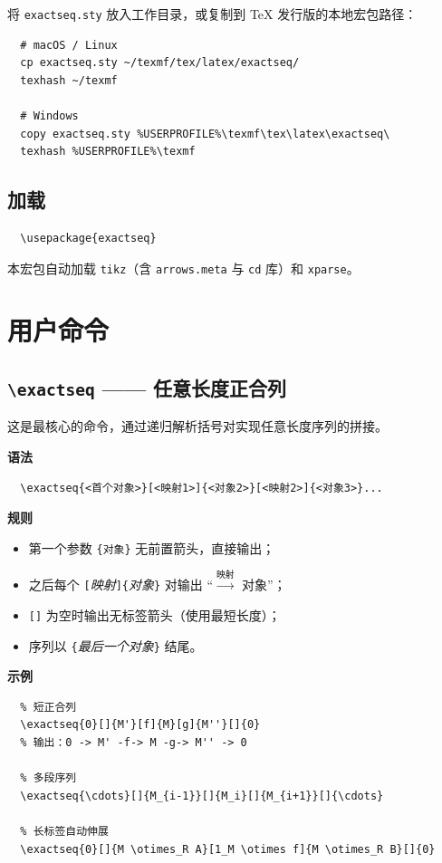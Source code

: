 \documentclass[fontset=fandol]{ctexart}
\newcommand{\pkg}[1]{\texttt{#1}}
\newcommand{\cmd}[1]{\texttt{\textbackslash #1}}
\newcommand{\marg}[1]{\texttt{\{#1\}}}
\newcommand{\meta}[1]{\textlangle\textit{#1}\textrangle}
\begin{document}
将 \texttt{exactseq.sty} 放入工作目录，或复制到 \TeX{} 发行版的本地宏包路径：

\begin{lstlisting}
  # macOS / Linux
  cp exactseq.sty ~/texmf/tex/latex/exactseq/
  texhash ~/texmf

  # Windows
  copy exactseq.sty %USERPROFILE%\texmf\tex\latex\exactseq\
  texhash %USERPROFILE%\texmf
\end{lstlisting}

\subsection{加载}

\begin{lstlisting}
  \usepackage{exactseq}
\end{lstlisting}

本宏包自动加载 \pkg{tikz}（含 \texttt{arrows.meta} 与 \texttt{cd} 库）和 \pkg{xparse}。

\section{用户命令}

\subsection{\cmd{exactseq} —— 任意长度正合列}

这是最核心的命令，通过递归解析括号对实现任意长度序列的拼接。

\medskip
\textbf{语法}
\begin{lstlisting}
  \exactseq{<首个对象>}[<映射1>]{<对象2>}[<映射2>]{<对象3>}...
\end{lstlisting}

\medskip
\textbf{规则}
\begin{itemize}
  \item 第一个参数 \marg{对象} 无前置箭头，直接输出；
  \item 之后每个 \texttt{[}\meta{映射}\texttt{]\{}\meta{对象}\texttt{\}} 对输出
        ``$\xrightarrow{\text{映射}}$ 对象''；
  \item \texttt{[}\texttt{]} 为空时输出无标签箭头（使用最短长度）；
  \item 序列以 \texttt{\{}\meta{最后一个对象}\texttt{\}} 结尾。
\end{itemize}

\medskip
\textbf{示例}
\begin{lstlisting}
  % 短正合列
  \exactseq{0}[]{M'}[f]{M}[g]{M''}[]{0}
  % 输出：0 -> M' -f-> M -g-> M'' -> 0

  % 多段序列
  \exactseq{\cdots}[]{M_{i-1}}[]{M_i}[]{M_{i+1}}[]{\cdots}

  % 长标签自动伸展
  \exactseq{0}[]{M \otimes_R A}[1_M \otimes f]{M \otimes_R B}[]{0}
\end{lstlisting}
\end{document}
